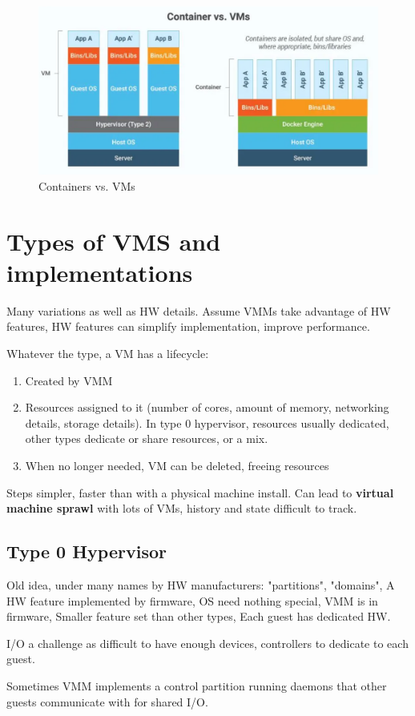 \begin{figure}[h!]
    \centering
    \includegraphics[width=0.6\linewidth]{img/dfvbsvbdfs.png}
    \caption{Containers vs. VMs}
\end{figure}

\newpage
\section{Types of VMS and implementations}
Many variations as well as HW details. Assume VMMs take advantage of HW features, HW features can simplify implementation, improve
performance.

Whatever the type, a VM has a lifecycle:
\begin{enumerate}
    \item Created by VMM
    \item Resources assigned to it (number of cores, amount of memory, networking details, storage details). In type 0 hypervisor, resources usually dedicated, other types dedicate or share resources, or a mix.
    \item When no longer needed, VM can be deleted, freeing resources
\end{enumerate}

Steps simpler, faster than with a physical machine install. Can lead to \textbf{virtual machine sprawl} with lots of VMs, history and state difficult to track.

\subsection{Type 0 Hypervisor}

Old idea, under many names by HW manufacturers: "partitions", "domains", A HW feature implemented by firmware, OS need nothing special, VMM is in firmware, Smaller feature set than other types, Each guest has dedicated HW.

I/O a challenge as difficult to have enough devices, controllers to dedicate to each guest.

Sometimes VMM implements a control partition running daemons
that other guests communicate with for shared I/O.

